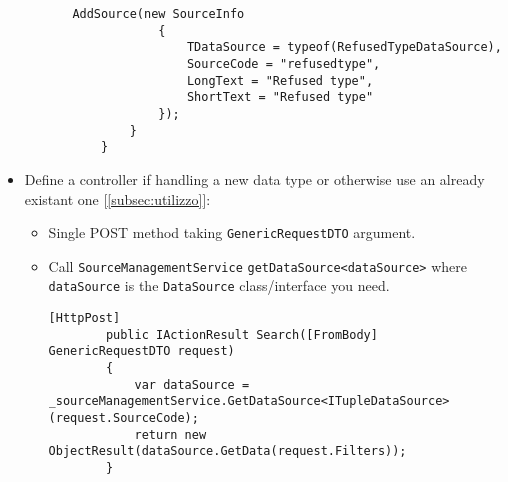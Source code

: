 \begin{itemize}
\begin{itemize}
\begin{itemize}
\begin{lstlisting}[caption={TupleDiscoveryConfiguration example}, style=javaScriptCode]
            AddSource(new SourceInfo
            {
                TDataSource = typeof(RefusedTypeDataSource),
                SourceCode = "refusedtype",
                LongText = "Refused type",
                ShortText = "Refused type"
            });
        }
    }                
            \end{lstlisting}
        \end{itemize}
    \end{itemize}
    \item Define a controller if handling a new data type or otherwise use an already existant one [\ref{subsec:utilizzo}]:
    \begin{itemize}
        \item Single POST method taking \verb|GenericRequestDTO| argument.
        \item Call \verb|SourceManagementService| \verb|getDataSource<dataSource>| where \verb|dataSource| is the \verb|DataSource| class/interface you need.
        \begin{lstlisting}[caption={HttpPost request in Controller example}, style=javaScriptCode]
        [HttpPost]
        public IActionResult Search([FromBody] GenericRequestDTO request)
        {
            var dataSource = _sourceManagementService.GetDataSource<ITupleDataSource>(request.SourceCode);
            return new ObjectResult(dataSource.GetData(request.Filters));
        }
        \end{lstlisting}
    \end{itemize}
\end{itemize}
